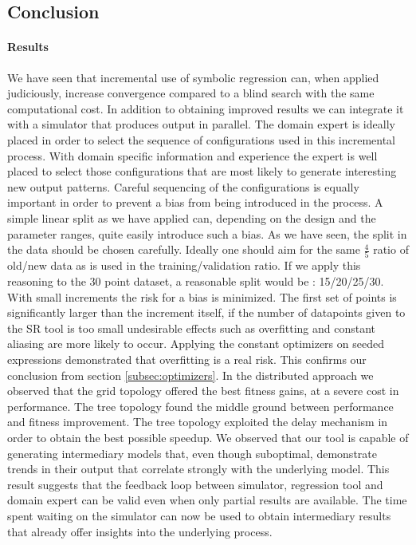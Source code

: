 \subsection{Conclusion}
\paragraph{Results}
We have seen that incremental use of symbolic regression can, when applied judiciously, increase convergence compared to a blind search with the same computational cost. In addition to obtaining improved results we can integrate it with a simulator that produces output in parallel. 
The domain expert is ideally placed in order to select the sequence of configurations used in this incremental process. With domain specific information and experience the expert is well placed to select those configurations that are most likely to generate interesting new output patterns. Careful sequencing of the configurations is equally important in order to prevent a bias from being introduced in the process. A simple linear split as we have applied can, depending on the design and the parameter ranges, quite easily introduce such a bias.
As we have seen, the split in the data should be chosen carefully. Ideally one should aim for the same $\frac{4}{5}$ ratio of old/new data as is used in the training/validation ratio. If we apply this reasoning to the 30 point dataset, a reasonable split would be : 15/20/25/30. With small increments the risk for a bias is minimized. The first set of points is significantly larger than the increment itself, if the number of datapoints given to the SR tool is too small undesirable effects such as overfitting and constant aliasing are more likely to occur.
Applying the constant optimizers on seeded expressions demonstrated that overfitting is a real risk. This confirms our conclusion from section \ref{subsec:optimizers}.
In the distributed approach we observed that the grid topology offered the best fitness gains, at a severe cost in performance. The tree topology found the middle ground between performance and fitness improvement. The tree topology exploited the delay mechanism in order to obtain the best possible speedup.
We observed that our tool is capable of generating intermediary models that, even though suboptimal, demonstrate trends in their output that correlate strongly with the underlying model. This result suggests that the feedback loop between simulator, regression tool and domain expert can be valid even when only partial results are available. The time spent waiting on the simulator can now be used to obtain intermediary results that already offer insights into the underlying process.


